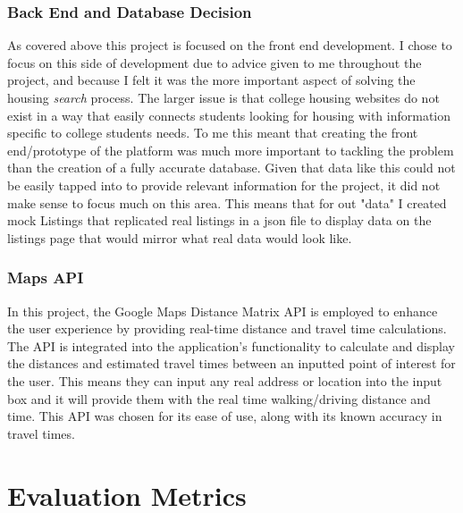 \documentclass[10pt,twocolumn]{article}
\begin{document}
\subsubsection{Back End and Database Decision}
As covered above this project is focused on the front end development. I chose to focus on this side of development due to advice given to me throughout the project, and because I felt it was the more important aspect of solving the housing \textit{search} process. The larger issue is that college housing websites do not exist in a way that easily connects students looking for housing with information specific to college students needs. To me this meant that creating the front end/prototype of the platform was much more important to tackling the problem than the creation of a fully accurate database. Given that data like this could not be easily tapped into to provide relevant information for the project, it did not make sense to focus much on this area. This means that for out "data" I created mock Listings that replicated real listings in a json file to display data on the listings page that would mirror what real data would look like. 

\subsubsection{Maps API}
In this project, the Google Maps Distance Matrix API is employed to enhance the user experience by providing real-time distance and travel time calculations. The API is integrated into the application's functionality to calculate and display the distances and estimated travel times between an inputted point of interest for the user. This means they can input any real address or location into the input box and it will provide them with the real time walking/driving distance and time. This API was chosen for its ease of use, along with its known accuracy in travel times. 

\section{Evaluation Metrics}
\end{document}
